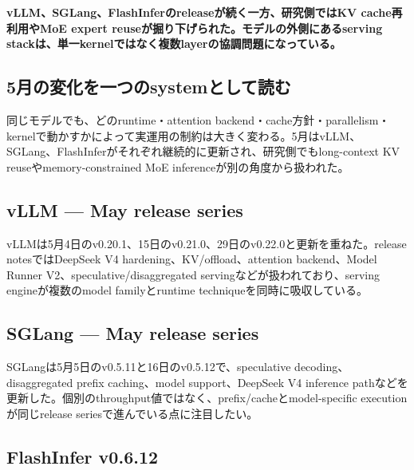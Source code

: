 \noindent\textbf{vLLM、SGLang、FlashInferのreleaseが続く一方、研究側ではKV cache再利用やMoE expert reuseが掘り下げられた。モデルの外側にあるserving stackは、単一kernelではなく複数layerの協調問題になっている。}\autocite{src-3707e05fd2a3,src-5a693cfc6852,src-69c5523286bd,src-74a7052acd7a,src-77e29e3fac8f,src-80b8d67933c0,src-ba75040df3fc,src-c97320147e8c}

\subsection{5月の変化を一つのsystemとして読む}

同じモデルでも、どのruntime・attention backend・cache方針・parallelism・kernelで動かすかによって実運用の制約は大きく変わる。5月はvLLM、SGLang、FlashInferがそれぞれ継続的に更新され、研究側でもlong-context KV reuseやmemory-constrained MoE inferenceが別の角度から扱われた。\autocite{src-3707e05fd2a3,src-5a693cfc6852,src-69c5523286bd,src-74a7052acd7a,src-77e29e3fac8f,src-80b8d67933c0,src-ba75040df3fc,src-c97320147e8c}


\subsection{vLLM — May release series}

vLLMは5月4日のv0.20.1、15日のv0.21.0、29日のv0.22.0と更新を重ねた。release notesではDeepSeek V4 hardening、KV/offload、attention backend、Model Runner V2、speculative/disaggregated servingなどが扱われており、serving engineが複数のmodel familyとruntime techniqueを同時に吸収している。\autocite{src-77e29e3fac8f,src-80b8d67933c0,src-c97320147e8c}


\subsection{SGLang — May release series}

SGLangは5月5日のv0.5.11と16日のv0.5.12で、speculative decoding、disaggregated prefix caching、model support、DeepSeek V4 inference pathなどを更新した。個別のthroughput値ではなく、prefix/cacheとmodel-specific executionが同じrelease seriesで進んでいる点に注目したい。\autocite{src-5a693cfc6852,src-69c5523286bd}


\subsection{FlashInfer v0.6.12}

